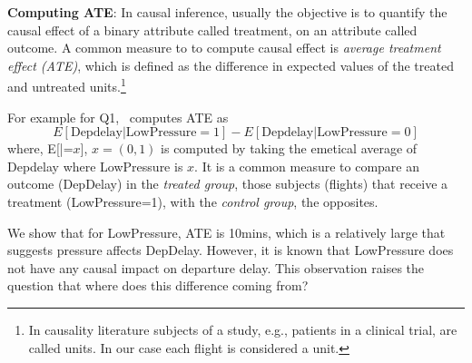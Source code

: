  { \bf Computing ATE}: In causal inference, usually the objective is to quantify
 the causal effect of a binary attribute called treatment, on an attribute called outcome.
 A common measure to to compute causal effect is {\em average treatment effect (ATE)}, which is defined as the difference in expected values of the treated and untreated units.\footnote{In causality literature subjects of a study,
  e.g., patients in a clinical trial, are called units. In our case each flight
   is considered a unit.} For example for Q1, \GSQL\ computes ATE as $$E[\text{Depdelay}|\text{LowPressure}=1] - E[\text{Depdelay}|\text{LowPressure}=0]$$
  where, E[|=$x$], $x=(0,1)$ is
  computed by taking the emetical average of  Depdelay where LowPressure is  $x$.
  It is a  common measure to compare an
  outcome (DepDelay) in the {\em treated group},  those subjects
  (flights) that receive a treatment (LowPressure=1), with the {\em control group}, the opposites.
  We show that for LowPressure, ATE is 10mins, which is a relatively large that suggests pressure affects DepDelay. However, it is known that
  LowPressure does not have any causal impact on departure delay. This observation raises the question that  where does this difference coming from?




